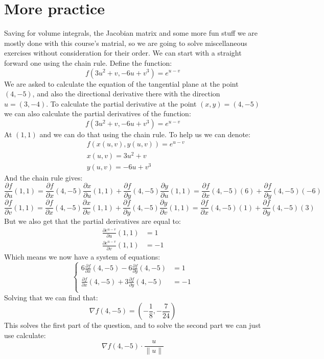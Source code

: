 \documentclass[11pt,a4paper]{article}
\begin{document}
	\section{More practice}
	Saving for volume integrals, the Jacobian matrix and some more fun stuff
	we are mostly done with this course's matrial, so we are going to
	solve miscellaneous exercises without consideration for their order.
	We can start with a straight forward one using the chain rule. 
	\newpage
	Define the function:
	\[
		f(3u^2 + v, -6u + v^3) = e^{u-v}
	\]
	We are asked to calculate the equation of the tangential plane at the
	point $(4,-5)$, and also the directional derivative there with the 
	direction $u = (3,-4)$. To calculate the partial derivative at the
	point $(x,y) = (4,-5)$ we can also calculate the partial derivatives
	of the function:
	\[
		f(3u^2 + v, -6u + v^3) = e^{u-v}
	\]
	At $(1,1)$ and we can do that using the chain rule. To help us
	we can denote:
	\begin{align*}
		&f(x(u,v),y(u,v)) = e^{u-v} \\
		&x(u,v) = 3u^2 + v \\
		&y(u,v) = -6u + v^3
	\end{align*}
	And the chain rule gives:
	\[
		\frac{\partial f}{\partial u}(1,1) =
		\frac{\partial f}{\partial x}(4,-5)
		\frac{\partial x}{\partial u}(1,1) + 
		\frac{\partial f}{\partial y}(4,-5)
		\frac{\partial y}{\partial u}(1,1) =
		\frac{\partial f}{\partial x}(4,-5)
		(6) + 
		\frac{\partial f}{\partial y}(4,-5)
		(-6)
	\]
	\[
		\frac{\partial f}{\partial v}(1,1) =
		\frac{\partial f}{\partial x}(4,-5)
		\frac{\partial x}{\partial v}(1,1) + 
		\frac{\partial f}{\partial y}(4,-5)
		\frac{\partial y}{\partial v}(1,1) =
		\frac{\partial f}{\partial x}(4,-5)
		(1) + 
		\frac{\partial f}{\partial y}(4,-5)
		(3)
	\]
	But we also get that the partial derivatives are equal to:
	\begin{align*}
		\frac{\partial e^{u-v}}{\partial u}(1,1) &= 1 \\
		\frac{\partial e^{u-v}}{\partial v}(1,1) &= -1
	\end{align*}
	Which means we now have a system of equations:
	\[
	\begin{cases}
		6\frac{\partial f}{\partial x}(4,-5) -
		6\frac{\partial f}{\partial y}(4,-5) &= 1 \\
		\frac{\partial f}{\partial x}(4,-5) + 
		3\frac{\partial f}{\partial y}(4,-5) &= -1 \\
	\end{cases}
	\]
	Solving that we can find that:
	\[
		\nabla f(4, -5) = \left( -\frac 18, -\frac{7}{24} \right)
	\]
	This solves the first part of the question, and to solve the second
	part we can just use calculate:
	\[
		\nabla f(4,-5) \cdot \frac{u}{\|u\|}
	\]
	
\end{document}
